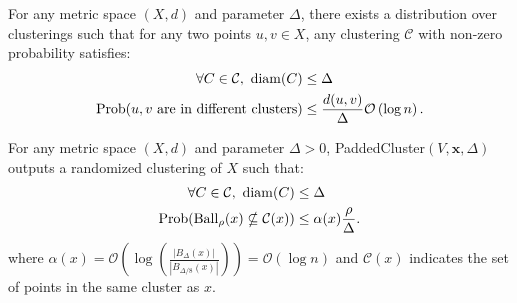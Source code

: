
\begin{theorem}[reference] \label{theorem:clustering:1}
For any metric space $(X,d)$ and parameter $\Delta$, there exists a distribution over clusterings such that for any two points $u,v \in X$, any clustering $\mathcal{C}$ with non-zero probability satisfies:
\begin{align*}
\forall C \in \mathcal{C},\ \mathrm{diam} (C) &\le \Delta \nonumber\\
{\rm Prob} (u,v \text{ are in different clusters}) &\le \frac{d(u,v)}{\Delta} \mathcal{O} \left( \log{n} \right). \nonumber
\end{align*}
\end{theorem}

\begin{theorem}[reference] \label{theorem:clustering:2}
For any metric space $(X,d)$ and parameter $\Delta > 0$, {\sf PaddedCluster}$(V,\mathbf{x},\Delta)$ outputs a randomized clustering of $X$ such that:
\begin{align*}
\forall C \in \mathcal{C},\ \mathrm{diam} (C) &\le \Delta \nonumber\\
{\rm Prob} (\mathrm{Ball}_\rho(x)\nsubseteq \mathcal{C}(x)) &\le \alpha (x) \frac{\rho}{\Delta}.\nonumber
\end{align*}
where $\alpha(x) = \mathcal{O}( \log (\frac{|B_{\Delta}(x)|}{|B_{\Delta/8}(x)|}) ) = \mathcal{O} (\log n)$ and $\mathcal{C} (x)$ indicates the set of points in the same cluster as $x$.
\end{theorem}

